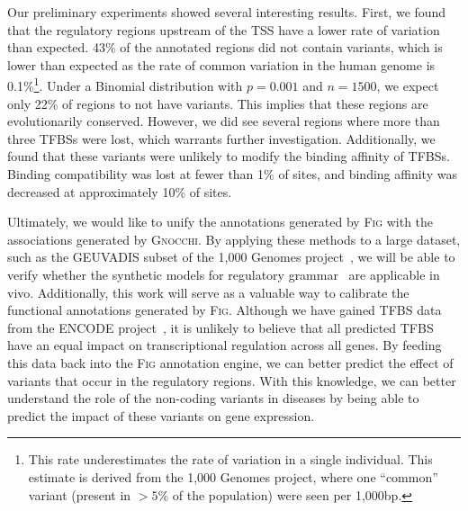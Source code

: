 \documentclass[11pt]{article} %
\begin{document}
Our preliminary experiments showed several interesting results. First, we found that the regulatory
regions upstream of the TSS have a lower rate of variation than expected. 43\% of the annotated
regions did not contain variants, which is lower than expected as the rate of common variation
in the human genome is 0.1\%\footnote{This rate underestimates the rate of variation in a single
individual. This estimate is derived from the 1,000 Genomes project, where one ``common'' variant
(present in $>5\%$ of the population) were seen per 1,000bp.}. Under a Binomial distribution with
$p = 0.001$ and $n = 1500$, we expect only 22\% of regions to not have variants. This implies that
these regions are evolutionarily conserved. However, we did see several regions where more than
three TFBSs were lost, which warrants further investigation. Additionally, we found that these
variants were unlikely to modify the binding affinity of TFBSs. Binding compatibility was lost at
fewer than 1\% of sites, and binding affinity was decreased at approximately 10\% of sites.

Ultimately, we would like to unify the annotations generated by \textsc{Fig} with the associations
generated by \textsc{Gnocchi}. By applying these methods to a large dataset, such as the
GEUVADIS subset of the 1,000 Genomes project~\cite{lappalainen13}, we will be able to verify
whether the synthetic models for regulatory grammar~\cite{levo14, sharon12, weingarten14}
are applicable in vivo. Additionally, this work will serve as a valuable way to calibrate the
functional annotations generated by \textsc{Fig}. Although we have gained TFBS data from the
ENCODE project~\cite{gerstein12, kheradpour14}, it is unlikely to believe that all predicted
TFBS have an equal impact on transcriptional regulation across all genes. By feeding this data
back into the \textsc{Fig} annotation engine, we can better predict the effect of variants
that occur in the regulatory regions. With this knowledge, we can better understand the role
of the non-coding variants in diseases by being able to predict the impact of these variants
on gene expression.



\end{document}
